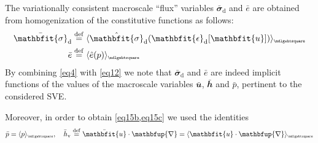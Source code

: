 \documentclass[12pt,a4paper]{article}
\renewcommand{\ta}[1]{\mathbfit{#1}}
\renewcommand{\ts}[1]{\mathbfit{#1}}
\renewcommand{\diff}{\mathbfup{\nabla}}
\renewcommand{\Box}{\mdlgwhtsquare}
\DeclarePairedDelimiter{\homgen}{\langle}{\rangle_\rve}
\renewcommand{\dev}{\mathrm{d}}
\renewcommand{\vol}{\mathrm{v}}
\newcommand{\rve}{
  {\mathchoice
   {\mbox{\scalebox{0.67}{$\Box$}}}
   {\mbox{\scalebox{0.67}{$\Box$}}}
   {\mbox{\scalebox{0.5}{$\Box$}}}
   {\mbox{\scalebox{0.375}{$\Box$}}}
  }
}
\begin{document}
The variationally consistent macroscale ``flux'' variables $\bar{\ts{\sigma}}_\dev$ and $\bar{e}$ are obtained from homogenization of the constitutive functions as follows:
\begin{subequations}\label{eq16}
\begin{align}
    \bar{\ts{\sigma}}_\dev &\defeq \homgen{ \hat{\ts{\sigma}}_\dev(\ts{\epsilon}_\dev[\ta{u}]) }
\label{eq16a} \\
    \bar{e} &\defeq \homgen{ \hat{e}(p) }
\label{eq16b}
\end{align}
\end{subequations}
By combining \eqref{eq4} with \eqref{eq12} we note that $\bar{\ts\sigma}_\dev$ and $\bar{e}$ are indeed implicit functions of the values of the macroscale variables $\bar{\ta u}$, $\bar{\ts h}$ and $\bar{p}$, pertinent to the considered SVE.

Moreover, in order to obtain \cref{eq15b,eq15c} we used the identities
\begin{equation}
    \bar{p} = \homgen{ p }, \quad \bar{h}_\vol \defeq \bar{\ta{u}}\cdot\diff = \homgen{ \ta{u}\cdot\diff }
\label{eq16c}
\end{equation}
\end{document}
